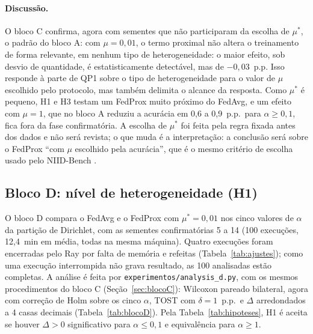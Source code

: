 \paragraph{Discussão.} O bloco C confirma, agora com sementes que não participaram da escolha de $\mu^*$, o padrão do bloco A: com $\mu = 0{,}01$, o termo proximal não altera o treinamento de forma relevante, em nenhum tipo de heterogeneidade: o maior efeito, sob desvio de quantidade, é estatisticamente detectável, mas de $-0{,}03$~p.p. Isso responde à parte de QP1 sobre o tipo de heterogeneidade para o valor de $\mu$ escolhido pelo protocolo, mas também delimita o alcance da resposta. Como $\mu^*$ é pequeno, H1 e H3 testam um FedProx muito próximo do FedAvg, e um efeito com $\mu = 1$, que no bloco A reduziu a acurácia em 0,6 a 0,9~p.p.\ para $\alpha \geq 0{,}1$, fica fora da fase confirmatória. A escolha de $\mu^*$ foi feita pela regra fixada antes dos dados e não será revista; o que muda é a interpretação: a conclusão será sobre o FedProx ``com $\mu$ escolhido pela acurácia'', que é o mesmo critério de escolha usado pelo NIID-Bench \citep{li2022niidbench}.

\subsection{Bloco D: nível de heterogeneidade (H1)}
\label{sec:blocoD}

O bloco D compara o FedAvg e o FedProx com $\mu^* = 0{,}01$ nos cinco valores de $\alpha$ da partição de Dirichlet, com as sementes confirmatórias 5 a 14 (100 execuções, 12,4~min em média, todas na mesma máquina). Quatro execuções foram encerradas pelo Ray por falta de memória e refeitas (Tabela~\ref{tab:ajustes}); como uma execução interrompida não grava resultado, as 100 analisadas estão completas. A análise é feita por \texttt{experimentos/analysis\_d.py}, com os mesmos procedimentos do bloco C (Seção~\ref{sec:blocoC}): Wilcoxon pareado bilateral, agora com correção de Holm sobre os cinco $\alpha$, TOST com $\delta = 1$~p.p.\ e $\Delta$ arredondados a 4 casas decimais (Tabela~\ref{tab:blocoD}). Pela Tabela~\ref{tab:hipoteses}, H1 é aceita se houver $\Delta > 0$ significativo para $\alpha \leq 0{,}1$ e equivalência para $\alpha \geq 1$.

